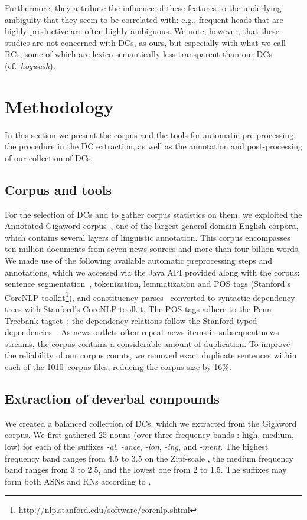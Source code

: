 \documentclass[output=paper]{langsci/langscibook}
\begin{document}
Furthermore, they attribute the influence of these features to the underlying  ambiguity that they seem to be correlated with: e.g., frequent heads that are highly productive are often highly ambiguous.  {We note, however, that these studies are not  concerned with DCs, as ours, but especially with what we call RCs, some of which are lexico-semantically less transparent than our DCs (cf.~\textit{hogwash}).}




\section{Methodology}\label{sec:methodology}
In this section we present the corpus and the tools for automatic pre-processing, the procedure in the DC extraction, as well as the annotation and post-processing of our collection of DCs.
\subsection{Corpus and tools}
For the selection of DCs and to gather corpus statistics on them, we exploited the Annotated Gigaword corpus~\citep{Napoles:12}, one of the largest general-domain English corpora, which contains several layers of linguistic annotation. This corpus encompasses ten million documents from seven news sources and more than four billion words.                                      
We made use of the following available automatic preprocessing steps and annotations, which we accessed via the Java API provided along with the corpus: sentence segmentation~\citep{Gillick:09}, tokenization, lemmatization and POS tags (Stanford's CoreNLP toolkit\footnote{http://nlp.stanford.edu/software/corenlp.shtml}), and constituency parses~\citep{Huang:10} converted to syntactic dependency trees with Stanford's CoreNLP toolkit.
The POS tags adhere to the Penn Treebank tagset~\citep{Santorini:93}; the dependency relations follow the Stanford typed dependencies~\citep{Marneffe:08}.
As news outlets often repeat news items in subsequent news streams, the corpus contains a considerable amount of duplication. To improve the reliability of our corpus counts,  we removed exact duplicate sentences within each of the 1010~corpus files, reducing the corpus size by 16\%.


\subsection{Extraction of deverbal compounds}\label{sec:extraction:dcs}
We created a balanced collection of DCs, which we extracted from the Gigaword corpus. We first gathered 25 nouns (over three frequency bands : high, medium, low) for each of the suffixes \textit{-al}, \textit{-ance}, \textit{-ion}, \textit{-ing}, and \textit{-ment}. The highest frequency band ranges from 4.5 to 3.5 on the Zipf-scale \citep{VanHeuven:2014}, the medium frequency band ranges from 3 to 2.5, and the lowest one from 2 to 1.5. 
The suffixes may form both ASNs and RNs according to \cite{grimshaw:90}. 
\end{document}
